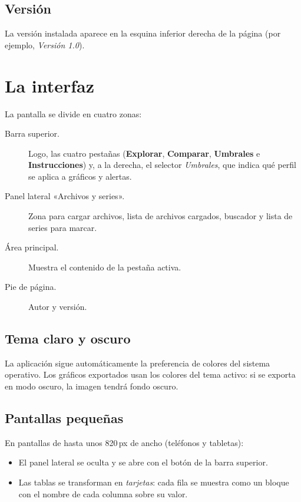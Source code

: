 \documentclass[11pt,a4paper,oneside]{report}
\newcommand{\boton}[1]{\fcolorbox{linea}{white}{\small\sffamily #1}}
\newcommand{\pestana}[1]{\textsf{\textbf{\color{acento}#1}}}
\newcommand{\campo}[1]{\textsf{\textit{#1}}}
\begin{document}
\section{Versión}

La versión instalada aparece en la esquina inferior derecha de la página
(por ejemplo, \emph{Versión 1.0}).

\chapter{La interfaz}

La pantalla se divide en cuatro zonas:

\begin{description}
  \item[Barra superior.] Logo, las cuatro pestañas
    (\pestana{Explorar}, \pestana{Comparar}, \pestana{Umbrales} e
    \pestana{Instrucciones}) y, a la derecha, el selector
    \campo{Umbrales}, que indica qué perfil se aplica a gráficos y alertas.
  \item[Panel lateral «Archivos y series».] Zona para cargar archivos, lista
    de archivos cargados, buscador y lista de series para marcar.
  \item[Área principal.] Muestra el contenido de la pestaña activa.
  \item[Pie de página.] Autor y versión.
\end{description}

\section{Tema claro y oscuro}

La aplicación sigue automáticamente la preferencia de colores del sistema
operativo. Los gráficos exportados usan los colores del tema activo: si se
exporta en modo oscuro, la imagen tendrá fondo oscuro.

\section{Pantallas pequeñas}

En pantallas de hasta unos 820\,px de ancho (teléfonos y tabletas):

\begin{itemize}
  \item El panel lateral se oculta y se abre con el botón
        \boton{Archivos} de la barra superior.
  \item Las tablas se transforman en \emph{tarjetas}: cada fila se muestra como
        un bloque con el nombre de cada columna sobre su valor.
\end{itemize}
\end{document}
